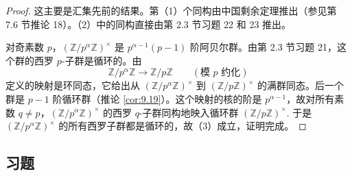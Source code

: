\begin{proof}
这主要是汇集先前的结果。第（1）个同构由中国剩余定理推出（参见第 7.6 节推论 18）。（2）中的同构直接由第 2.3 节习题 22 和 23 推出。

对奇素数 \(p\)，\((\mathbb{Z}/p^\alpha\mathbb{Z})^\times\) 是 \(p^{\alpha-1}(p-1)\) 阶阿贝尔群。由第 2.3 节习题 21，这个群的西罗 \(p\)-子群是循环的。由
\[
\mathbb{Z}/p^\alpha\mathbb{Z} \longrightarrow \mathbb{Z}/p\mathbb{Z} \qquad (\text{模 } p \text{ 约化})
\]
定义的映射是环同态，它给出从 \((\mathbb{Z}/p^\alpha\mathbb{Z})^\times\) 到 \((\mathbb{Z}/p\mathbb{Z})^\times\) 的满群同态。后一个群是 \(p-1\) 阶循环群（推论 \ref{cor:9.19}）。这个映射的核的阶是 \(p^{\alpha-1}\)，故对所有素数 \(q \neq p\)，\((\mathbb{Z}/p^\alpha\mathbb{Z})^\times\) 的西罗 \(q\)-子群同构地映入循环群 \((\mathbb{Z}/p\mathbb{Z})^\times\). 于是 \((\mathbb{Z}/p^\alpha\mathbb{Z})^\times\) 的所有西罗子群都是循环的，故（3）成立，证明完成。
\end{proof}

\subsection*{习题}

